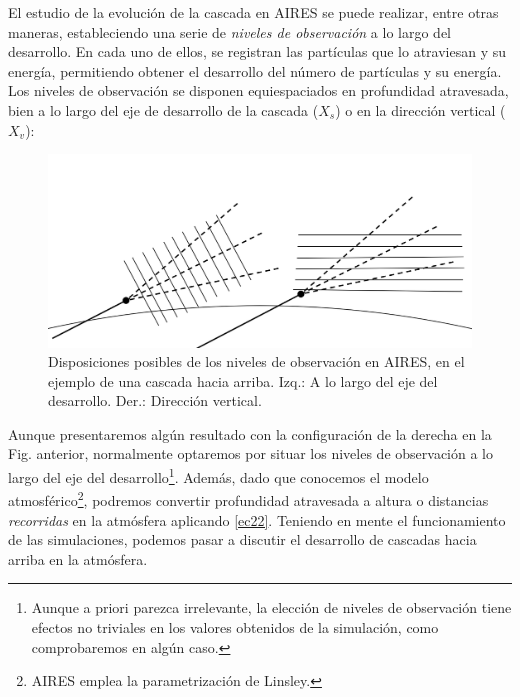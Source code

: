 \documentclass[12 pt, a4paper]{article} %
\numberwithin{equation}{section}
\numberwithin{figure}{section}
\numberwithin{table}{section}
\begin{document}
El estudio de la evolución de la cascada en AIRES se puede realizar, entre otras maneras, estableciendo una serie de \textit{niveles de observación} a lo largo del desarrollo. En cada uno de ellos, se registran las partículas que lo atraviesan y su energía, permitiendo obtener el desarrollo del número de partículas y su energía. Los niveles de observación se disponen equiespaciados en profundidad atravesada, bien a lo largo del eje de desarrollo de la cascada ($X_s$) o en la dirección vertical ($X_v$):
\clearpage
	\begin{figure}[H]
		\centering
		\includegraphics[width=.6\linewidth]{figures/cascadas/AIRES_planos}
		\caption{Disposiciones posibles de los niveles de observación en AIRES, en el ejemplo de una cascada hacia arriba. Izq.: A lo largo del eje del desarrollo. Der.: Dirección vertical.}
		\label{AIRES_planos}
	\end{figure}
	
Aunque presentaremos algún resultado con la configuración de la derecha en la Fig. anterior, normalmente optaremos por situar los niveles de observación a lo largo del eje del desarrollo\footnote{ Aunque a priori parezca irrelevante, la elección de niveles de observación tiene efectos no triviales en los valores obtenidos de la simulación, como comprobaremos en algún caso.}. Además, dado que conocemos el modelo atmosférico\footnote{ AIRES emplea la parametrización de Linsley.}, podremos convertir profundidad atravesada a altura o distancias \textit{recorridas} en la atmósfera aplicando \eqref{ec22}. Teniendo en mente el funcionamiento de las simulaciones, podemos pasar a discutir el desarrollo de cascadas hacia arriba en la atmósfera.
\end{document}
